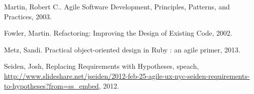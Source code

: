 \documentclass[12pt]{report}
\begin{document}
%
%
\begin{thebibliography}{00}
%
Martin, Robert C.. Agile Software Development, Principles, Patterns,
and Practices, 2003.

Fowler, Martin. Refactoring: Improving the Design of Existing Code, 2002.

Metz, Sandi. Practical object-oriented design in Ruby : an agile primer, 2013.

Seiden, Josh, Replacing Requirements with Hypotheses, speach,
\url{http://www.slideshare.net/jseiden/2012-feb-25-agile-ux-nyc-seiden-requirements-to-hypotheses?from=ss_embed}, 2012.

\end{thebibliography}
% 
\end{document}
